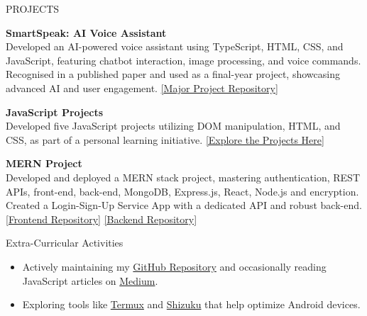 \documentclass{resume} %
\begin{document}
\begin{rSection}{PROJECTS}

 \textbf{SmartSpeak: AI Voice Assistant} \\
Developed an AI-powered voice assistant using TypeScript, HTML, CSS, and JavaScript, featuring chatbot interaction, image processing, and voice commands. Recognised in a published paper and used as a final-year project, showcasing advanced AI and user engagement. \href{https://github.com/vaan-github/SMART-SPEAK-AI-VOICE-ASSISTANT}{[Major Project Repository]}

\item \textbf{JavaScript Projects} \\ 
Developed five JavaScript projects utilizing DOM manipulation, HTML, and CSS, as part of a personal learning initiative. \href{https://github.com/vaan-github/JavaScript/tree/main/7_Projects}{[Explore the Projects Here]}

\item \textbf{MERN Project} \\ 
Developed and deployed a MERN stack project, mastering authentication, REST APIs, front-end, back-end, MongoDB, Express.js, React, Node.js and encryption. Created a Login-Sign-Up Service App with a dedicated API and robust back-end. \href{https://github.com/vaan-github/mern_login_signup_react-native.git}{[Frontend Repository]} \href{https://github.com/vaan-github/Server_mern_login_signup_react-native.git}{[Backend Repository]}

\end{rSection}


\begin{rSection}{Extra-Curricular Activities} 

\begin{itemize}
    \item Actively maintaining my \href{https://github.com/vaan-github}{GitHub Repository} and occasionally reading JavaScript articles on \href{https://medium.com/}{Medium}.
    \item Exploring tools like \href{https://github.com/termux}{Termux} and \href{https://github.com/RikkaApps/Shizuku}{Shizuku} that help optimize Android devices.
\end{itemize}

\end{rSection}
\end{document}
